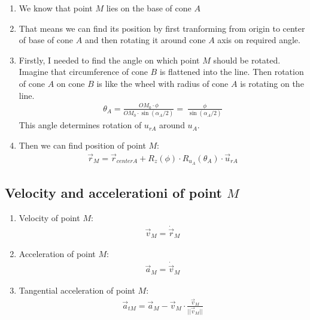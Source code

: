 \begin{enumerate}
    \item We know that point $M$ lies on the base of cone $A$
    \item That means we can find its position by first tranforming from origin to center of base of cone $A$ and then rotating it around cone $A$ axis on required angle.
    \item Firstly, I needed to find the angle on which point $M$ should be rotated.
          Imagine that circumference of cone $B$ is flattened into the line. Then rotation of cone $A$ on cone $B$ is like the wheel with radius of cone $A$ is rotating on the line.
          \begin{align}
              \theta_A = \frac{OM_0 \cdot \phi }{OM_0 \cdot \sin({\alpha_A / 2})} =\
              \frac{\phi }{\sin({\alpha_A / 2})}
          \end{align}
          This angle determines rotation of $u_{rA}$ around $u_A$.
    \item Then we can find position of point $M$:
          \begin{align}
              \vec{r}_{M} = \vec{r}_{centerA} + R_z(\phi) \cdot R_{u_A}(\theta_A) \cdot \vec{u}_{rA}
          \end{align}
\end{enumerate}

\subsection{Velocity and accelerationi of point $M$}

\begin{enumerate}
    \item Velocity of point $M$:
          \begin{align}
              \vec{v}_{M} = \dot{\vec{r}}_{M}
          \end{align}
    \item Acceleration of point $M$:
          \begin{align}
              \vec{a}_{M} = \dot{\vec{v}}_{M}
          \end{align}
    \item Tangential acceleration of point $M$:
          \begin{align}
              \vec{a}_{tM} = \vec{a}_{M} - \vec{v}_{M} \cdot \frac{\vec{v}_{M}}{||\vec{v}_{M}||}
          \end{align}

\end{enumerate}


